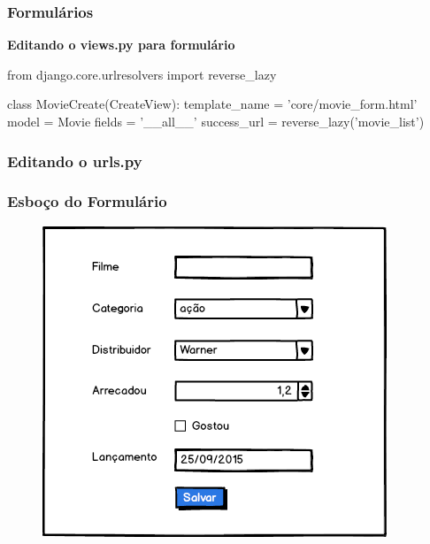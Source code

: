 \documentclass[aspectratio=169]{beamer}
\begin{document}
\begin{frame}[fragile]\frametitle{Formul\'arios}

\textbf{Editando o views.py para formul\'ario}

\begin{pythoncode}
from django.core.urlresolvers import reverse_lazy

class MovieCreate(CreateView):
    template_name = 'core/movie_form.html'
    model = Movie
    fields = '__all__'
    success_url = reverse_lazy('movie_list')
\end{pythoncode}

\end{frame}

\begin{frame}[fragile]\frametitle{Editando o urls.py}


\end{frame}

\begin{frame}\frametitle{Esbo\c co do Formul\'ario}

	\begin{figure}[h]
	  \centering
  		\includegraphics[height=.8\paperheight]{img/form.png}
	\end{figure}

\end{frame}
\end{document}
